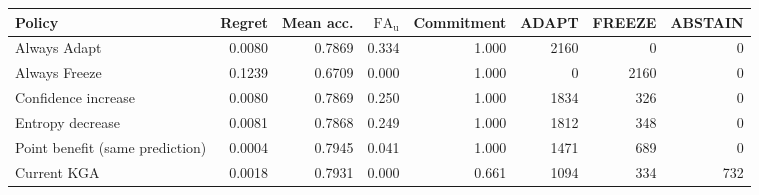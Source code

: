 \begin{tabular}{@{}lrrrrrrr@{}}
\toprule
Policy & Regret & Mean acc. & $\mathrm{FA}_{\mathrm u}$ & Commitment & ADAPT & FREEZE & ABSTAIN \\
\midrule
Always Adapt & 0.0080 & 0.7869 & 0.334 & 1.000 & 2160 & 0 & 0 \\
Always Freeze & 0.1239 & 0.6709 & 0.000 & 1.000 & 0 & 2160 & 0 \\
Confidence increase & 0.0080 & 0.7869 & 0.250 & 1.000 & 1834 & 326 & 0 \\
Entropy decrease & 0.0081 & 0.7868 & 0.249 & 1.000 & 1812 & 348 & 0 \\
Point benefit (same prediction) & 0.0004 & 0.7945 & 0.041 & 1.000 & 1471 & 689 & 0 \\
Current KGA & 0.0018 & 0.7931 & 0.000 & 0.661 & 1094 & 334 & 732 \\
\bottomrule
\end{tabular}
